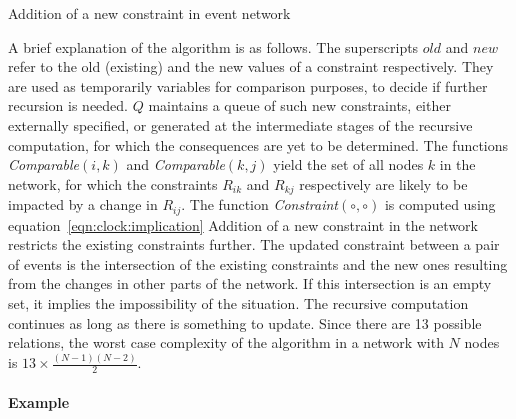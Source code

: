 \begin{algorithm}[!htpb]
	\SetAlgoLined
	\DontPrintSemicolon
	\caption{Addition of a new constraint in event network}
	\label{algo:clock:add}
\end{algorithm}

A brief explanation of the algorithm is as follows. The superscripts $old$ and $new$ refer to the old (existing) and the new 
values of a constraint respectively. They are used as temporarily variables for comparison purposes, to decide if further recursion 
is needed. $Q$ maintains a queue of such new constraints, either externally specified, or generated at the intermediate stages of the 
recursive computation, for which the consequences are yet to be determined. The functions {\em Comparable$(i,k)$} and {\em Comparable$(k,j)$}
yield the set of all nodes $k$ in the network, for which the constraints $R_{ik}$ and $R_{kj}$ respectively are likely to be impacted by 
a change in $R_{ij}$. The function {\em Constraint$(\circ, \circ)$} is computed using equation~\ref{eqn:clock:implication}
%
Addition of a new constraint in the network restricts the existing constraints further. The updated constraint between a pair of 
events is the intersection of the existing constraints and the new ones resulting from the changes in other parts of the network.
If this intersection is an empty set, it implies the impossibility of the situation.
The recursive computation continues as long as there is something to update. Since there are 13 possible relations, the worst case 
complexity of the algorithm in a network with $N$ nodes is $13 \times \frac{(N-1)(N-2)}{2}$.

\paragraph{Example}

